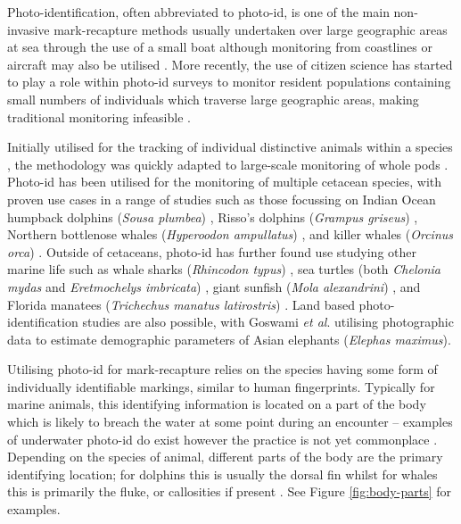 Photo-identification, often abbreviated to photo-id, is one of the main non-invasive mark-recapture methods usually undertaken over large geographic areas at sea through the use of a small boat although monitoring from coastlines or aircraft may also be utilised \cite{hammond_individual_1990, evans_monitoring_2004, payne_long_1986, forney_seasonal_1998, wursig_methods_1990}. More recently, the use of citizen science has started to play a role within photo-id surveys to monitor resident populations containing small numbers of individuals which traverse large geographic areas, making traditional monitoring infeasible \cite{gibson_using_2020, cheney_integrating_2013}.

Initially utilised for the tracking of individual distinctive animals within a species \cite{caldwell_evidence_1955, schevill_daily_1960}, the methodology was quickly adapted to large-scale monitoring of whole pods \cite{alves_population_2013, franklin_migratory_2008}. Photo-id has been utilised for the monitoring of multiple cetacean species, with proven use cases in a range of studies such as those focussing on Indian Ocean humpback dolphins (\textit{Sousa plumbea}) \cite{sharpe_indian_2019}, Risso's dolphins (\textit{Grampus griseus}) \cite{miragliuolo_rissos_2004}, Northern bottlenose whales (\textit{Hyperoodon ampullatus}) \cite{feyrer_origin_2021}, and killer whales (\textit{Orcinus orca}) \cite{bigg_assessment_1982}. Outside of cetaceans, photo-id has further found use studying other marine life such as whale sharks (\textit{Rhincodon typus}) \cite{holmberg_estimating_2009}, sea turtles (both \textit{Chelonia mydas} and \textit{Eretmochelys imbricata}) \cite{reisser_photographic_2008}, giant sunfish (\textit{Mola alexandrini}) \cite{pedersen_finding_2023}, and Florida manatees (\textit{Trichechus manatus latirostris}) \cite{langtimm_survival_2004}. Land based photo-identification studies are also possible, with Goswami \textit{et al}. \cite{goswami_application_2007} utilising photographic data to estimate demographic parameters of Asian elephants (\textit{Elephas maximus}).

Utilising photo-id for mark-recapture relies on the species having some form of individually identifiable markings, similar to human fingerprints. Typically for marine animals, this identifying information is located on a part of the body which is likely to breach the water at some point during an encounter -- examples of underwater photo-id do exist however the practice is not yet commonplace \cite{vanbressem_visual_2018, veronique_underwater_2022}. Depending on the species of animal, different parts of the body are the primary identifying location; for dolphins this is usually the dorsal fin whilst for whales this is primarily the fluke, or callosities if present \cite{vernazzani_eastern_2013, arnbom_individual_1987, constantine_abundance_2012, sharpe_indian_2019, baird_population_2009}. See Figure \ref{fig:body-parts} for examples.

